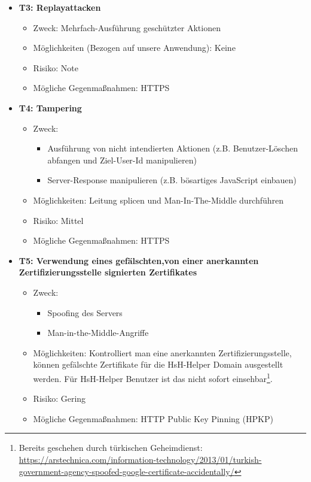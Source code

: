\documentclass[12pt,DIV14,BCOR10mm,a4paper,parskip=half-,headsepline,headinclude,english,ngerman,bibliography=totocnumbered]{scrreprt}
\begin{document}
\begin{itemize}
  \hypertarget{threat3}{}
  \item \textbf{T3: Replayattacken}
  \begin{itemize}
  \item Zweck: Mehrfach-Ausführung geschützter Aktionen
  \item Möglichkeiten (Bezogen auf unsere Anwendung): Keine
  \item Risiko: Note
  \item Mögliche Gegenmaßnahmen: HTTPS %
  \end{itemize}

  \hypertarget{threat4}{}
  \item \textbf{T4: Tampering}
  \begin{itemize}
  \item Zweck:
  	\begin{itemize}
  		\item Ausführung von nicht intendierten Aktionen (z.B. Benutzer-Löschen abfangen und Ziel-User-Id manipulieren)
  		\item Server-Response manipulieren (z.B. bösartiges JavaScript einbauen)
	\end{itemize}
  \item Möglichkeiten: Leitung splicen und Man-In-The-Middle durchführen
  \item Risiko: Mittel
  \item Mögliche Gegenmaßnahmen: HTTPS
  \end{itemize}

  \hypertarget{threat5}{}
  \item \textbf{T5: Verwendung eines gefälschten,von einer anerkannten Zertifizierungsstelle signierten Zertifikates}
  \begin{itemize}
  \item Zweck:
  	\begin{itemize}
  		\item Spoofing des Servers
  		\item Man-in-the-Middle-Angriffe
   \end{itemize}
  \item Möglichkeiten: Kontrolliert man eine anerkannten Zertifizierungsstelle, können gefälschte Zertifikate für die HsH-Helper Domain ausgestellt werden. Für HsH-Helper Benutzer ist das nicht sofort einsehbar\footnote{Bereits geschehen durch türkischen Geheimdienst: \url{https://arstechnica.com/information-technology/2013/01/turkish-government-agency-spoofed-google-certificate-accidentally/}}.
  \item Risiko: Gering
  \item Mögliche Gegenmaßnahmen: HTTP Public Key Pinning (HPKP)
  \end{itemize}


\end{itemize}
\end{document}
